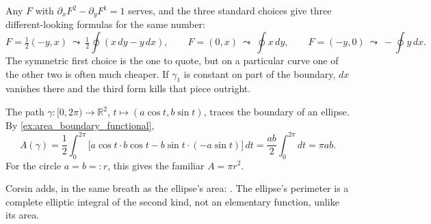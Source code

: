 \begin{remark}
Any $F$ with $\partial_xF^2 - \partial_yF^1 = 1$ serves, and the three standard choices give
three different-looking formulas for the same number:
\[F = \tfrac12(-y,x) \ \leadsto\ \tfrac12\oint (x\,dy - y\,dx), \qquad
  F = (0,x) \ \leadsto\ \oint x\,dy, \qquad
  F = (-y,0) \ \leadsto\ -\oint y\,dx.\]
The symmetric first choice is the one to quote, but on a particular curve one of the other two is
often much cheaper. If $\gamma_1$ is constant on part of the boundary, $dx$ vanishes there and the
third form kills that piece outright.
\end{remark}

\begin{example}[Ellipse]
\label{ex:area_ellipse}
The path $\gamma : [0,2\pi) \to \mathbb{R}^2$, $t \mapsto (a\cos t,b\sin t)$, traces the
boundary of an ellipse. By \cref{ex:area_boundary_functional},
\[
A(\gamma) = \frac12\int_0^{2\pi} \big[a\cos t\cdot b\cos t - b\sin t\cdot(-a\sin t)\big]\,dt
  = \frac{ab}{2}\int_0^{2\pi} dt = \pi ab.
\]
For the circle $a=b=:r$, this gives the familiar $A = \pi r^2$.
\end{example}

\begin{ainote}
Corsin adds, in the same breath as the ellipse's area: . The ellipse's perimeter is a
complete elliptic integral of the second kind, not an elementary function, unlike its area.
\end{ainote}




